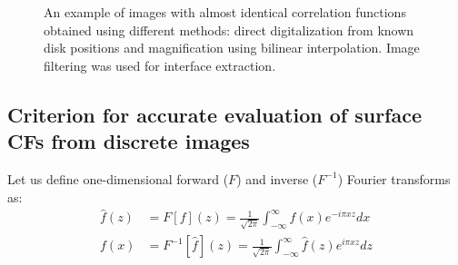\documentclass[reprint,amsmath,amssymb,aps,pre,showkeys,showpacs]{revtex4-1}
\begin{document}
\begin{figure}[!pt]
{    \label{fig:resized-sv}}
  \caption[]{An example of images with almost identical correlation functions
    obtained using different methods: direct digitalization from known disk
    positions and magnification using bilinear interpolation. Image filtering
    was used for interface extraction.}
  \label{fig:resized}
\end{figure}

\subsection{Criterion for accurate evaluation of surface CFs from discrete images}
\label{sec:crit}
Let us define one-dimensional forward ($F$) and inverse ($F^{-1}$) Fourier
transforms as:
\begin{align}
  \hat{f}(z) &= F[f](z) = \frac{1}{\sqrt{2\pi}}\int_{-\infty}^{\infty} f(x)
  e^{-i\pi xz} dx \label{eq:fourier-forward} \\
  f(x) &= F^{-1}[\hat{f}](z) = \frac{1}{\sqrt{2\pi}}\int_{-\infty}^{\infty} \hat{f}(z)
  e^{i\pi xz} dz \label{eq:fourier-backward}
\end{align}
\end{document}
